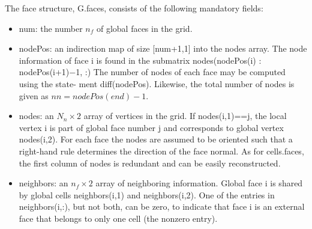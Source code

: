 \documentclass[12pt]{report}
\begin{document}
The face structure, G.faces, consists of the following mandatory fields:
\begin{itemize}
 \item num: the number $n_f$ of global faces in the grid.
 \item nodePos: an indirection map of size [num+1,1] into the nodes array. 
 The node information of face i is found in the submatrix
nodes(nodePos(i) : nodePos(i+1)−1, :)
The number of nodes of each face may be computed using the state-
ment diff(nodePos). Likewise, the total number of nodes is given as $nn =
nodePos(end)−1$.
\item nodes: an $N_n \times 2$ array of vertices in the grid. If nodes(i,1)==j, the local
vertex i is part of global face number j and corresponds to global vertex nodes(i,2). 
For each face the nodes are assumed to be oriented such
that a right-hand rule determines the direction of the face normal. As
for cells.faces, the first column of nodes is redundant and can be easily
reconstructed. 
\item  neighbors: an $n_f \times 2$ array of neighboring information. Global face i is
shared by global cells neighbors(i,1) and neighbors(i,2). One of the entries
in neighbors(i,:), but not both, can be zero, to indicate that face i is an
external face that belongs to only one cell (the nonzero entry).

\end{itemize}
\end{document}
